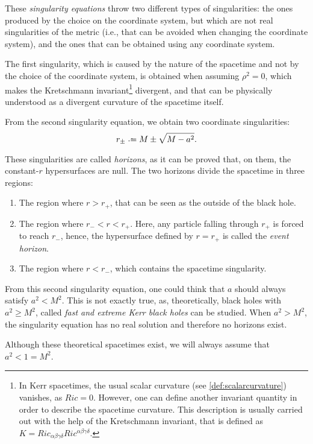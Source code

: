 These \emph{singularity equations} throw two different types of singularities: the ones produced by the choice on the coordinate system, but which are not real singularities of the metric (i.e., that can be avoided when changing the coordinate system), and the ones that can be obtained using any coordinate system.

The first singularity, which is caused by the nature of the spacetime and not by the choice of the coordinate system, is obtained when assuming $\rho^2 = 0$, which makes the Kretschmann invariant\footnote{In Kerr spacetimes, the usual scalar curvature (see \autoref{def:scalarcurvature}) vanishes, as $Ric = 0$. However, one can define another invariant quantity in order to describe the spacetime curvature. This description is usually carried out with the help of the Kretschmann invariant, that is defined as $K = Ric_{\alpha\beta\gamma\delta}Ric^{\alpha\beta\gamma\delta}$.} divergent, and that can be physically understood as a divergent curvature of the spacetime itself.

From the second singularity equation, we obtain two coordinate singularities:
\[
	r_{\pm} \defeq M \pm \sqrt{M - a^2}.
\]

These singularities are called \emph{horizons}, as it can be proved \cite[p. 15]{galindo14} that, on them, the constant-$r$ hypersurfaces are null. The two horizons divide the spacetime in three regions:
\begin{enumerate}
	\item The region where $r > r_+$, that can be seen as the outside of the black hole.
	\item The region where $r_- < r < r_+$. Here, any particle falling through $r_+$ is forced to reach $r_-$, hence, the hypersurface defined by $r = r_+$ is called the \emph{event horizon}.
	\item The region where $r < r_-$, which contains the spacetime singularity.
\end{enumerate}

\begin{remark}
	From this second singularity equation, one could think that $a$ should always satisfy $a^2 < M^2$. This is not exactly true, as, theoretically, black holes with $a^2 \geq M^2$, called \emph{fast and extreme Kerr black holes} can be studied. When $a^2 > M^2$, the singularity equation has no real solution and therefore no horizons exist.
	
	Although these theoretical spacetimes exist, we will always assume that $a^2 < 1 = M^2$.
\end{remark}

